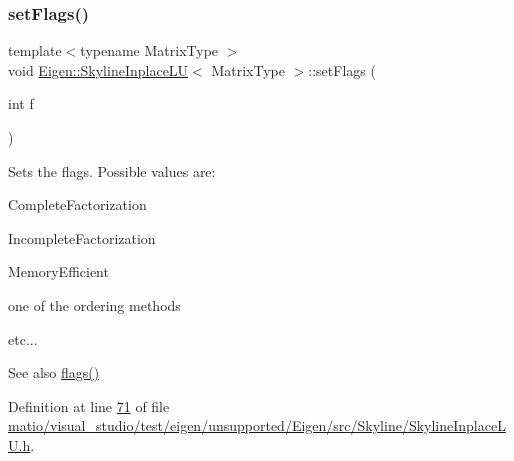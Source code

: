 \mbox{\label{class_eigen_1_1_skyline_inplace_l_u_afd8013d183aaca495dfd10d819e61aaf}} 
\subsubsection{\texorpdfstring{set\+Flags()}{setFlags()}\hspace{0.1cm}{\footnotesize\ttfamily [1/2]}}
{\footnotesize\ttfamily template$<$typename Matrix\+Type $>$ \\
void \hyperlink{class_eigen_1_1_skyline_inplace_l_u}{Eigen\+::\+Skyline\+Inplace\+LU}$<$ Matrix\+Type $>$\+::set\+Flags (\begin{DoxyParamCaption}\item[{int}]{f }\end{DoxyParamCaption})\hspace{0.3cm}{\ttfamily [inline]}}

Sets the flags. Possible values are\+:
\begin{DoxyItemize}
\item Complete\+Factorization
\item Incomplete\+Factorization
\item Memory\+Efficient
\item one of the ordering methods
\item etc...
\end{DoxyItemize}

\begin{DoxySeeAlso}{See also}
\hyperlink{class_eigen_1_1_skyline_inplace_l_u_a5e491f7643c548ac81d3f4a7e432be19}{flags()} 
\end{DoxySeeAlso}


Definition at line \hyperlink{matio_2visual__studio_2test_2eigen_2unsupported_2_eigen_2src_2_skyline_2_skyline_inplace_l_u_8h_source_l00071}{71} of file \hyperlink{matio_2visual__studio_2test_2eigen_2unsupported_2_eigen_2src_2_skyline_2_skyline_inplace_l_u_8h_source}{matio/visual\+\_\+studio/test/eigen/unsupported/\+Eigen/src/\+Skyline/\+Skyline\+Inplace\+L\+U.\+h}.

\mbox{\label{class_eigen_1_1_skyline_inplace_l_u_afd8013d183aaca495dfd10d819e61aaf}} 
